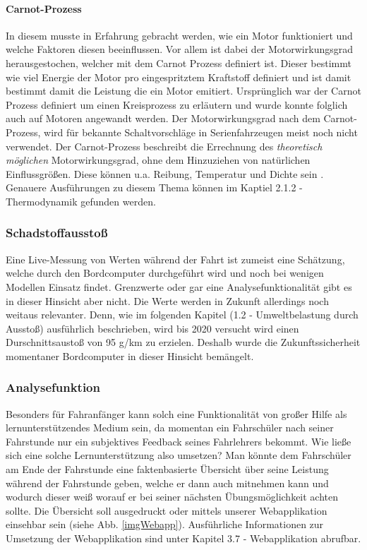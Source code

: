 \paragraph{Carnot-Prozess}
In diesem musste in Erfahrung gebracht werden, wie ein Motor funktioniert und welche Faktoren diesen beeinflussen. Vor allem ist dabei der Motorwirkungsgrad herausgestochen, welcher mit dem Carnot Prozess definiert ist. Dieser bestimmt wie viel Energie der Motor pro eingespritztem Kraftstoff definiert und ist damit bestimmt damit die Leistung die ein Motor emitiert. Ursprünglich war der Carnot Prozess definiert um einen Kreisprozess zu erläutern und wurde konnte folglich auch auf Motoren angewandt werden.
Der Motorwirkungsgrad nach dem Carnot-Prozess, wird für bekannte Schaltvorschläge in Serienfahrzeugen meist noch nicht verwendet. Der Carnot-Prozess beschreibt die Errechnung des \textit{theoretisch möglichen} Motorwirkungsgrad, ohne dem Hinzuziehen von natürlichen Einflussgrößen. Diese können u.a. Reibung, Temperatur und Dichte sein \cite{SIMR.CH1-Fahrstil-Analyse.CarnotWirkungsgrad}. Genauere Ausführungen zu diesem Thema können im Kaptiel 2.1.2 - Thermodynamik gefunden werden. 

\subsubsection{Schadstoffausstoß}
Eine Live-Messung von  Werten während der Fahrt ist zumeist eine Schätzung, welche durch den Bordcomputer durchgeführt wird und noch bei wenigen Modellen Einsatz findet. Grenzwerte oder gar eine Analysefunktionalität gibt es in dieser Hinsicht aber nicht. Die  Werte werden in Zukunft allerdings noch weitaus relevanter. Denn, wie im folgenden Kapitel (1.2 - Umweltbelastung durch  Ausstoß) ausführlich beschrieben, wird bis 2020 versucht wird einen Durschnittsaustoß von 95 g/km zu erzielen. \cite{SIMR.CH1-Fahrstil_Analyse.EUVerordCO2} Deshalb wurde die Zukunftssicherheit momentaner Bordcomputer in dieser Hinsicht bemängelt.

\subsubsection{Analysefunktion}
Besonders für Fahranfänger kann solch eine Funktionalität von großer Hilfe als lernunterstützendes Medium sein, da momentan ein Fahrschüler nach seiner Fahrstunde nur ein subjektives Feedback seines Fahrlehrers bekommt. Wie ließe sich eine solche Lernunterstützung also umsetzen?
Man könnte dem Fahrschüler am Ende der Fahrstunde eine faktenbasierte Übersicht über seine Leistung während der Fahrstunde geben, welche er dann auch mitnehmen kann und wodurch dieser weiß worauf er bei seiner nächsten Übungsmöglichkeit achten sollte. Die Übersicht soll ausgedruckt oder mittels unserer Webapplikation einsehbar sein (siehe Abb. \autoref{imgWebapp}). Ausführliche Informationen zur Umsetzung der Webapplikation sind unter Kapitel 3.7 - Webapplikation abrufbar.

